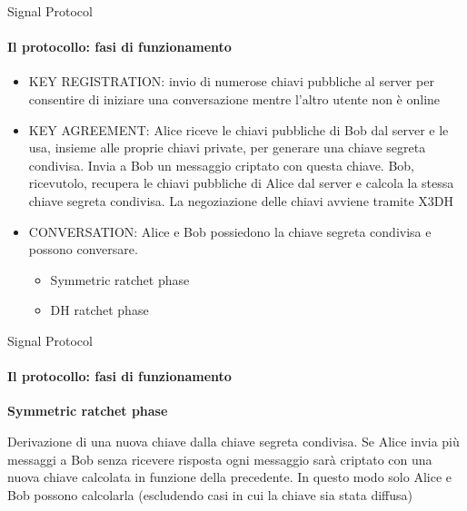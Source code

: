 \begin{frame}{Signal Protocol}
    \framesubtitle{Il protocollo: fasi di funzionamento \cite{VanDam}}
    \begin{itemize}
        \item KEY REGISTRATION: invio di numerose chiavi pubbliche al server per consentire di iniziare una conversazione mentre l'altro utente non è online\pause
        \item KEY AGREEMENT: Alice riceve le chiavi pubbliche di Bob dal server e le usa, insieme alle proprie chiavi private, per generare una chiave segreta condivisa. Invia a Bob un messaggio criptato con questa chiave. Bob, ricevutolo, recupera le chiavi pubbliche di Alice dal server e calcola la stessa chiave segreta condivisa. La negoziazione delle chiavi avviene tramite X3DH\pause
        \item CONVERSATION: Alice e Bob possiedono la chiave segreta condivisa e possono conversare.
                            \begin{itemize}
                                \item Symmetric ratchet phase
                                \item DH ratchet phase
                            \end{itemize}
    \end{itemize}

\end{frame}

\begin{frame}{Signal Protocol}
    \framesubtitle{Il protocollo: fasi di funzionamento}
    \textbf{Symmetric ratchet phase}\newline

    Derivazione di una nuova chiave dalla chiave segreta condivisa.\newline\pause
    Se Alice invia più messaggi a Bob senza ricevere risposta ogni messaggio sarà criptato con una nuova chiave calcolata in funzione della precedente.\newline\pause
    In questo modo solo Alice e Bob possono calcolarla (escludendo casi in cui la chiave sia stata diffusa)
    
\end{frame}

